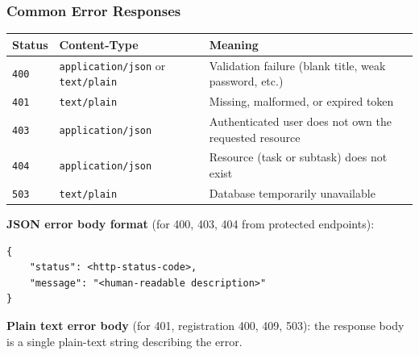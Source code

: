 \newpage

\subsubsection{Common Error Responses}

\begin{tabularx}{\textwidth}{@{} l l X @{}}
  \toprule
  \textbf{Status} & \textbf{Content-Type} & \textbf{Meaning} \\
  \midrule
  \texttt{400} & \texttt{application/json} or \texttt{text/plain} & Validation failure (blank title, weak password, etc.) \\
  \texttt{401} & \texttt{text/plain} & Missing, malformed, or expired token \\
  \texttt{403} & \texttt{application/json} & Authenticated user does not own the requested resource \\
  \texttt{404} & \texttt{application/json} & Resource (task or subtask) does not exist \\
  \texttt{503} & \texttt{text/plain} & Database temporarily unavailable \\
  \bottomrule
\end{tabularx}


\noindent\textbf{JSON error body format} (for 400, 403, 404 from protected endpoints):
\begin{lstlisting}[style=json]
{
    "status": <http-status-code>,
    "message": "<human-readable description>"
}
\end{lstlisting}

\noindent\textbf{Plain text error body} (for 401, registration 400, 409, 503):
the response body is a single plain-text string describing the error.

\newpage
